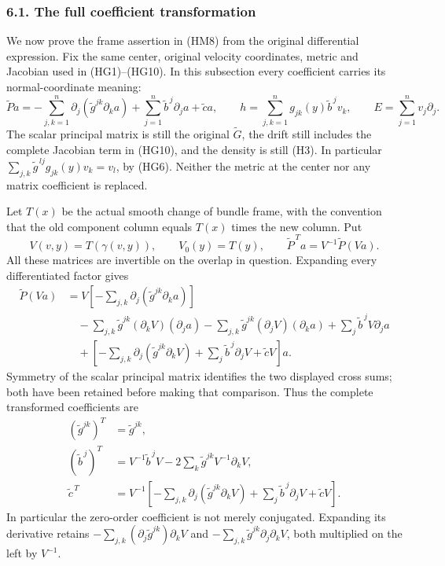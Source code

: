 \documentclass[
  11pt,
]{article}
\begin{document}
\subsubsection{6.1. The full coefficient
transformation}\label{the-full-coefficient-transformation}

We now prove the frame assertion in (HM8) from the original differential
expression. Fix the same center, original velocity coordinates, metric
and Jacobian used in (HG1)--(HG10). In this subsection every coefficient
carries its normal-coordinate meaning: \[
 \widetilde P a
 =-\sum_{j,k=1}^n\partial_j
          (\widetilde g^{jk}\partial_k a)
       +\sum_{j=1}^n\widetilde b^{\,j}\partial_j a
       +\widetilde c a,\qquad
 h=\sum_{j,k=1}^n g_{jk}(y)\widetilde b^{\,j}v_k,\qquad
 E=\sum_{j=1}^n v_j\partial_j .
 \tag{MC0}
\] The scalar principal matrix is still the original \(\widetilde G\),
the drift still includes the complete Jacobian term in (HG10), and the
density is still (H3). In particular
\(\sum_{j,k} \widetilde g^{\,lj}g_{jk}(y)v_k=v_l\), by (HG6). Neither
the metric at the center nor any matrix coefficient is replaced.

Let \(T(x)\) be the actual smooth change of bundle frame, with the
convention that the old component column equals \(T(x)\) times the new
column. Put \[
 V(v,y)=T(\gamma(v,y)),\qquad V_0(y)=T(y),\qquad
 \widetilde P^{\,T}a=V^{-1}\widetilde P(Va).
 \tag{MC1}
\] All these matrices are invertible on the overlap in question.
Expanding every differentiated factor gives \[
\begin{split}
 \widetilde P(Va)
 &=V\left[-\sum_{j,k}\partial_j
                  (\widetilde g^{jk}\partial_k a)\right]\\
 &\quad-\sum_{j,k}\widetilde g^{jk}
                  (\partial_kV)(\partial_j a)
       -\sum_{j,k}\widetilde g^{jk}
                  (\partial_jV)(\partial_k a)
       +\sum_j\widetilde b^{\,j}V\partial_j a\\
 &\quad+\left[-\sum_{j,k}\partial_j
                  (\widetilde g^{jk}\partial_kV)
       +\sum_j\widetilde b^{\,j}\partial_jV
       +\widetilde cV\right]a.
\end{split}
\tag{MC2}
\] Symmetry of the scalar principal matrix identifies the two displayed
cross sums; both have been retained before making that comparison. Thus
the complete transformed coefficients are \[
\begin{split}
 (\widetilde g^{jk})^{T}&=\widetilde g^{jk},\\
 (\widetilde b^{\,j})^{T}
 &=V^{-1}\widetilde b^{\,j}V
       -2\sum_k\widetilde g^{jk}V^{-1}\partial_kV,\\
 \widetilde c^{\,T}
 &=V^{-1}\left[-\sum_{j,k}
          \partial_j(\widetilde g^{jk}\partial_kV)
          +\sum_j\widetilde b^{\,j}\partial_jV
          +\widetilde cV\right].
\end{split}
\tag{MC3}
\] In particular the zero-order coefficient is not merely conjugated.
Expanding its derivative retains
\(-\sum_{j,k}(\partial_j\widetilde g^{jk})\partial_kV\) and
\(-\sum_{j,k}\widetilde g^{jk}\partial_j\partial_kV\), both multiplied
on the left by \(V^{-1}\).
\end{document}

